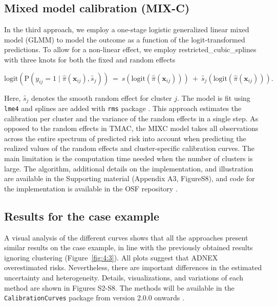 \subsection{Mixed model calibration (MIX-C)}
In the third approach, we employ a one-stage logistic generalized linear mixed model (\gls{GLMM}) to model the outcome as a function of the logit-transformed predictions. To allow for a non-linear effect, we employ \gls{restricted_cubic_splines} with three knots for both the fixed and random effects

\[\text{logit}\left( \text{P}\left( y_{ij} = 1\mid\widehat{\pi}\left( \mathbf{x}_{ij} \right),\widetilde{s_{j}} \right) \right)\  = \ s\left( \text{logit}\left( \widehat{\pi}\left( \mathbf{x}_{ij} \right) \right) \right)\  + \ \widetilde{s_{j}}\left( \text{logit}\left( \widehat{\pi}\left( \mathbf{x}_{ij} \right) \right) \right).\]

Here, \(\widetilde{s_{j}}\) denotes the smooth random effect for cluster \(j\). The model is fit using \texttt{lme4} \cite{batesFittingLinearMixedEffects2015} and splines are added with \texttt{rms} package \cite{harrelljrRmsRegressionModeling2009}. This approach estimates the calibration per cluster and the variance of the random effects in a single step. As opposed to the random effects in \gls{TMAC}, the \gls{MIXC} model takes all observations across the entire spectrum of predicted risk into account when predicting the realized values of the random effects and cluster-specific calibration curves. The main limitation is the computation time needed when the number of clusters is large. The algorithm, additional details on the implementation, and illustration are available in the Supporting material (Appendix A3, FigureS8), and code for the implementation is available in the \gls{OSF} repository \cite{barrenadaOSFClusteredFlexible2024}.

\subsection{Results for the case example}
A visual analysis of the different curves shows that all the approaches present similar results on the case example, in line with the previously obtained results ignoring clustering (Figure~\ref{fig:4:3}). All plots suggest that \gls{ADNEX} overestimated risks. Nevertheless, there are important differences in the estimated uncertainty and heterogeneity. Details, visualizations, and variations of each method are shown in Figures S2-S8. The methods will be available in the \texttt{CalibrationCurves} package from version 2.0.0 onwards \cite{decockCalibrationCurvesPackageAssessing2023}.

